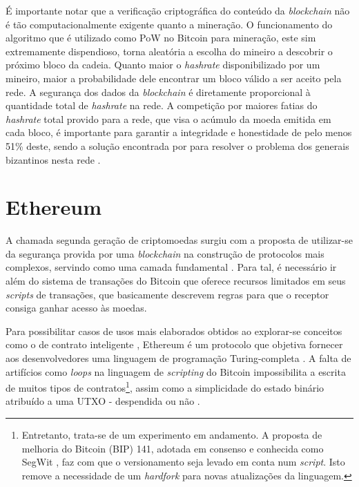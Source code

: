 \documentclass[a4paper,12pt]{monografia}
\theoremstyle{plain}
\theoremstyle{definition}
\theoremstyle{remark}
\begin{document}
\'{E} importante notar que a verifica\c{c}\~{a}o criptogr\'{a}fica do conte\'{u}do da \textit{blockchain} n\~{a}o \'e t\~ao computacionalmente exigente quanto a minera\c{c}\~ao.
O funcionamento do algoritmo que \'{e} utilizado como PoW no Bitcoin para minera\c{c}\~{a}o, este sim extremamente dispendioso, torna aleat\'{o}ria a escolha do mineiro a descobrir o pr\'{o}ximo bloco da cadeia.
Quanto maior o \textit{hashrate} disponibilizado por um mineiro, maior a probabilidade dele encontrar um bloco v\'{a}lido a ser aceito pela rede.
A seguran\c{c}a dos dados da \textit{blockchain} \'e diretamente proporcional \`a quantidade total de \textit{hashrate} na rede. A competi\c{c}\~{a}o por maiores fatias do \textit{hashrate} total provido para a rede, que visa o ac\'umulo da moeda emitida em cada bloco, \'{e} importante para garantir a integridade e honestidade de pelo menos 51\% deste, sendo a solu\c{c}\~{a}o encontrada por  para resolver o problema dos generais bizantinos nesta rede \cite{byzantium}.

\section{Ethereum}

A chamada segunda gera\c{c}\~ao de criptomoedas surgiu com a proposta de utilizar-se da seguran\c{c}a provida por uma \textit{blockchain} na constru\c{c}\~ao de protocolos mais complexos, servindo como uma camada fundamental \cite{survey}.
Para tal, \'e necess\'ario ir al\'em do sistema de transa\c{c}\~oes do Bitcoin que oferece recursos limitados em seus \textit{scripts} de transa\c{c}\~oes, que basicamente descrevem regras para que o receptor consiga ganhar acesso \`as moedas.

Para possibilitar casos de usos mais elaborados obtidos ao explorar-se conceitos como o de contrato inteligente \cite{smartcontract}, Ethereum \'e um protocolo que objetiva fornecer aos desenvolvedores uma linguagem de programa\c{c}\~ao Turing-completa \cite{ethereum}.
A falta de artif\'icios como \textit{loops} na linguagem de \textit{scripting} do Bitcoin impossibilita a escrita de muitos tipos de contratos\footnote{Entretanto, trata-se de um experimento em andamento. A proposta de melhoria do Bitcoin (BIP) 141, adotada em consenso e conhecida como SegWit \cite{segwit}, faz com que o versionamento seja levado em conta num \textit{script}. Isto remove a necessidade de um \textit{hardfork} para novas atualiza\c{c}\~oes da linguagem.}, assim como a simplicidade do estado bin\'ario atribu\'ido a uma UTXO - despendida ou n\~ao  \cite{utxodan}.
\end{document}
